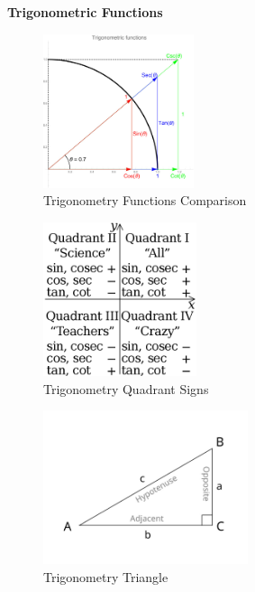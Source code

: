 \begingroup
\begin{center}
\fontsize{15}{15}\sffamily\selectfont
\textbf{Trigonometric Functions}
\end{center}
\endgroup


\begin{table}[H]
    \centering
    \begin{minipage}[t]{0.3\linewidth}
        \begin{figure}[H]
            \centering
            \includegraphics[height=4.5cm]{Pictures/maths/TrigFunctions.jpg}
            \caption{Trigonometry Functions Comparison}
        \end{figure}
    \end{minipage}
    \hfill
    \begin{minipage}[t]{0.3\linewidth}
        \begin{figure}[H]
            \centering
            \includegraphics[height=4.5cm]{Pictures/maths/Trigonometric_function_quadrant_sign.png}
            \caption{Trigonometry Quadrant Signs}
        \end{figure}
    \end{minipage}
    \begin{minipage}[t]{0.3\linewidth}
        \begin{figure}[H]
            \centering
            \includegraphics[height=4.5cm]{Pictures/maths/TrigonometryTriangle.jpg}
            \caption{Trigonometry Triangle}
        \end{figure}        
    \end{minipage}
\end{table}

